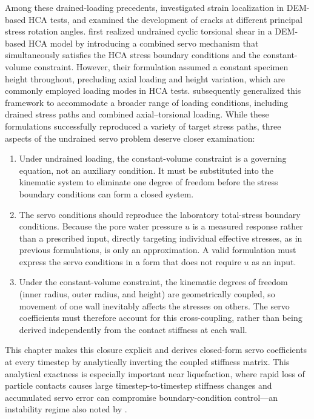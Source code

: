 \documentclass[../main]{subfiles}
\begin{document}
Among these drained-loading precedents, \citet{LiGuoZhang2014} investigated strain localization in DEM-based HCA tests, and \citet{Liu2021} examined the development of cracks at different principal stress rotation angles. \citet{Han2024jgs} first realized undrained cyclic torsional shear in a DEM-based HCA model by introducing a combined servo mechanism that simultaneously satisfies the HCA stress boundary conditions and the constant-volume constraint. However, their formulation assumed a constant specimen height throughout, precluding axial loading and height variation, which are commonly employed loading modes in HCA tests. \citet{Ma2024} subsequently generalized this framework to accommodate a broader range of loading conditions, including drained stress paths and combined axial--torsional loading. While these formulations successfully reproduced a variety of target stress paths, three aspects of the undrained servo problem deserve closer examination:
\begin{enumerate}
\item[(a)] Under undrained loading, the constant-volume constraint is a governing equation, not an auxiliary condition. It must be substituted into the kinematic system to eliminate one degree of freedom before the stress boundary conditions can form a closed system.
\item[(b)] The servo conditions should reproduce the laboratory total-stress boundary conditions. Because the pore water pressure $u$ is a measured response rather than a prescribed input, directly targeting individual effective stresses, as in previous formulations, is only an approximation. A valid formulation must express the servo conditions in a form that does not require $u$ as an input.
\item[(c)] Under the constant-volume constraint, the kinematic degrees of freedom (inner radius, outer radius, and height) are geometrically coupled, so movement of one wall inevitably affects the stresses on others. The servo coefficients must therefore account for this cross-coupling, rather than being derived independently from the contact stiffness at each wall.
\end{enumerate}
This chapter makes this closure explicit and derives closed-form servo coefficients at every timestep by analytically inverting the coupled stiffness matrix. This analytical exactness is especially important near liquefaction, where rapid loss of particle contacts causes large timestep-to-timestep stiffness changes and accumulated servo error can compromise boundary-condition control---an instability regime also noted by \citet{Ma2024}.
\end{document}

